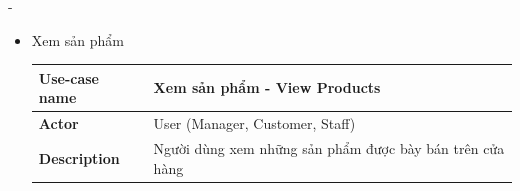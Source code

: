 \begin {list} {-}{}
\begin{itemize}
\begin{table}[h]
\begin{tabular}{|l|l|}
        \end{tabular}
        \begin{center}
        \end{center}
        \caption{Đặc tả use case đăng ký tài khoản}
        \label{table:1}
    \end{table}
    \newpage
    \item Xem sản phẩm
    \begin{table}[h]
        \begin{tabular}{|l|l|}
        \hline
        \textbf{Use-case name}    & \textbf{Xem sản phẩm - View Products}                                                                                                                                                                                                                                                                                                                                                                                                                                                                                                                                                                                                                                                                                                                                                                           \\ \hline
        \textbf{Actor}            & User (Manager, Customer, Staff)                                                                                                                                                                                                                                                                                                                                                                                                                                                                                                                                                                                                                                                                                                                                                                                 \\ \hline
        \textbf{Description}      & Người dùng xem những sản phẩm được bày bán trên cửa hàng                                                                                                                                                                                                                                                                                                                                                                                                                                                                                                                                                                                                                                                                                                                                                        \\ \hline

\end{tabular}
\end{table}
\end{itemize}
\end{list}
